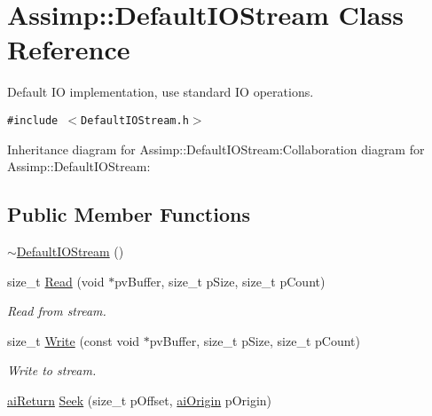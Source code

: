 \hypertarget{class_assimp_1_1_default_i_o_stream}{
\section{Assimp::DefaultIOStream Class Reference}
\label{class_assimp_1_1_default_i_o_stream}
}
Default IO implementation, use standard IO operations.  


{\tt \#include $<$DefaultIOStream.h$>$}

Inheritance diagram for Assimp::DefaultIOStream:Collaboration diagram for Assimp::DefaultIOStream:\subsection*{Public Member Functions}
\begin{CompactItemize}
\item 
\hyperlink{class_assimp_1_1_default_i_o_stream_d21769a2e865f8522ba2ebd97b75beda}{$\sim$DefaultIOStream} ()
\item 
\hypertarget{class_assimp_1_1_default_i_o_stream_a45b659531f179122c7e7852ad6f5f14}{
size\_\-t \hyperlink{class_assimp_1_1_default_i_o_stream_a45b659531f179122c7e7852ad6f5f14}{Read} (void $\ast$pvBuffer, size\_\-t pSize, size\_\-t pCount)}
\label{class_assimp_1_1_default_i_o_stream_a45b659531f179122c7e7852ad6f5f14}

\begin{CompactList}\small\item\em Read from stream. \item\end{CompactList}\item 
\hypertarget{class_assimp_1_1_default_i_o_stream_05de25f9ac717801fbd0aad06499657a}{
size\_\-t \hyperlink{class_assimp_1_1_default_i_o_stream_05de25f9ac717801fbd0aad06499657a}{Write} (const void $\ast$pvBuffer, size\_\-t pSize, size\_\-t pCount)}
\label{class_assimp_1_1_default_i_o_stream_05de25f9ac717801fbd0aad06499657a}

\begin{CompactList}\small\item\em Write to stream. \item\end{CompactList}\item 
\hypertarget{class_assimp_1_1_default_i_o_stream_1f4b8aa9afaaa2b300d6cee6165a6a6d}{
\hyperlink{types_8h_1f78dfb65090aa930cabb984c8abe711}{aiReturn} \hyperlink{class_assimp_1_1_default_i_o_stream_1f4b8aa9afaaa2b300d6cee6165a6a6d}{Seek} (size\_\-t pOffset, \hyperlink{types_8h_c50fbaa57d78776ca99e42104d9b2786}{aiOrigin} pOrigin)}
\label{class_assimp_1_1_default_i_o_stream_1f4b8aa9afaaa2b300d6cee6165a6a6d}


\end{CompactItemize}
